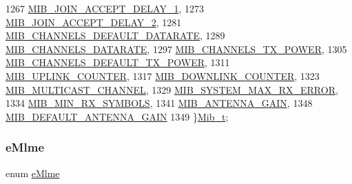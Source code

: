 \begin{DoxyCode}
1267     \mbox{\hyperlink{group___l_o_r_a_m_a_c_gga32ea83d13a3f5bb4b3ec2ace2319ab61a3fa6b527109f8a6d5994ddaf7e9b0bd1}{MIB\_JOIN\_ACCEPT\_DELAY\_1}},
1273     \mbox{\hyperlink{group___l_o_r_a_m_a_c_gga32ea83d13a3f5bb4b3ec2ace2319ab61aa1ca7d4484b41008a69d5d786cfd6a20}{MIB\_JOIN\_ACCEPT\_DELAY\_2}},
1281     \mbox{\hyperlink{group___l_o_r_a_m_a_c_gga32ea83d13a3f5bb4b3ec2ace2319ab61addef34adbf844ace9eeea97ae93da918}{MIB\_CHANNELS\_DEFAULT\_DATARATE}},
1289     \mbox{\hyperlink{group___l_o_r_a_m_a_c_gga32ea83d13a3f5bb4b3ec2ace2319ab61a78f3b4e3ae4ebaacb478073d2a2ec4f1}{MIB\_CHANNELS\_DATARATE}},
1297     \mbox{\hyperlink{group___l_o_r_a_m_a_c_gga32ea83d13a3f5bb4b3ec2ace2319ab61ae42f1a0c858ffdb283e0236a24ab6398}{MIB\_CHANNELS\_TX\_POWER}},
1305     \mbox{\hyperlink{group___l_o_r_a_m_a_c_gga32ea83d13a3f5bb4b3ec2ace2319ab61a9c5b2d3ad2caf87710b09e8a6e68cc6a}{MIB\_CHANNELS\_DEFAULT\_TX\_POWER}},
1311     \mbox{\hyperlink{group___l_o_r_a_m_a_c_gga32ea83d13a3f5bb4b3ec2ace2319ab61ad0d2e0023858ce3fab3647fa97428d84}{MIB\_UPLINK\_COUNTER}},
1317     \mbox{\hyperlink{group___l_o_r_a_m_a_c_gga32ea83d13a3f5bb4b3ec2ace2319ab61ae75b53deee33594312d1d2987c24b698}{MIB\_DOWNLINK\_COUNTER}},
1323     \mbox{\hyperlink{group___l_o_r_a_m_a_c_gga32ea83d13a3f5bb4b3ec2ace2319ab61af8ac424460fccb3115c6fe6ccb450862}{MIB\_MULTICAST\_CHANNEL}},
1329     \mbox{\hyperlink{group___l_o_r_a_m_a_c_gga32ea83d13a3f5bb4b3ec2ace2319ab61ad5d382841f32fba944bdb68b25699e45}{MIB\_SYSTEM\_MAX\_RX\_ERROR}},
1334     \mbox{\hyperlink{group___l_o_r_a_m_a_c_gga32ea83d13a3f5bb4b3ec2ace2319ab61a82fb27fd6414d2bde20a7a00c80e26a1}{MIB\_MIN\_RX\_SYMBOLS}},
1341     \mbox{\hyperlink{group___l_o_r_a_m_a_c_gga32ea83d13a3f5bb4b3ec2ace2319ab61a268b2f7da53dbc25655a7bdcc7e6128e}{MIB\_ANTENNA\_GAIN}},
1348     \mbox{\hyperlink{group___l_o_r_a_m_a_c_gga32ea83d13a3f5bb4b3ec2ace2319ab61afdc28fdfdbed01cb4c4ea59e0c9b9994}{MIB\_DEFAULT\_ANTENNA\_GAIN}}
1349 \}\mbox{\hyperlink{group___l_o_r_a_m_a_c_gaf17bd3de9ec75e4954be9a070cd8ddf9}{Mib\_t}};
\end{DoxyCode}
\mbox{\label{group___l_o_r_a_m_a_c_ga320f4c08fe99747b08463689be624f7b}} 
\subsubsection{\texorpdfstring{e\+Mlme}{eMlme}}
{\footnotesize\ttfamily enum \mbox{\hyperlink{group___l_o_r_a_m_a_c_ga320f4c08fe99747b08463689be624f7b}{e\+Mlme}}}



